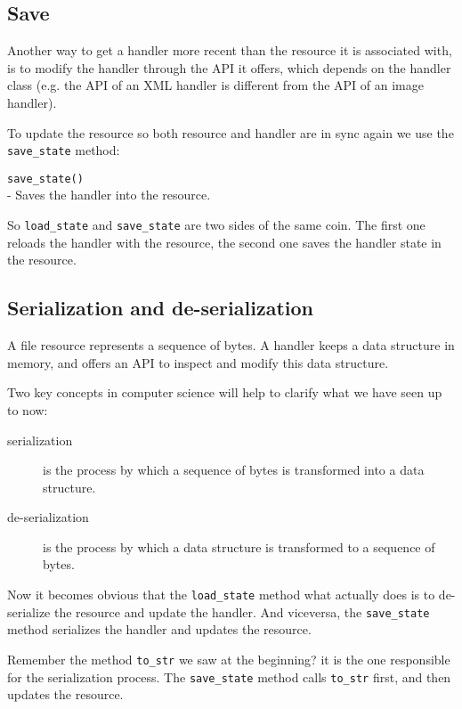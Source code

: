 \subsection{Save}

Another way to get a handler more recent than the resource it is associated
with, is to modify the handler through the API it offers, which depends
on the handler class (e.g. the API of an XML handler is different from the
API of an image handler).

To update the resource so both resource and handler are in sync again we
use the {\tt save\_state} method:

\begin{api}
  {\tt save\_state()}\\
  - Saves the handler into the resource.
\end{api}

So {\tt load\_state} and {\tt save\_state} are two sides of the same coin.
The first one reloads the handler with the resource, the second one saves
the handler state in the resource.


\subsection{Serialization and de-serialization}

A file resource represents a sequence of bytes. A handler keeps a data
structure in memory, and offers an API to inspect and modify this data
structure.

Two key concepts in computer science will help to clarify what we have
seen up to now:

\begin{description}
  \item [serialization] is the process by which a sequence of bytes is
    transformed into a data structure.

  \item [de-serialization] is the process by which a data structure is
    transformed to a sequence of bytes.
\end{description}

Now it becomes obvious that the {\tt load\_state} method what actually
does is to de-serialize the resource and update the handler. And viceversa,
the {\tt save\_state} method serializes the handler and updates the resource.

Remember the method {\tt to\_str} we saw at the beginning? it is the one
responsible for the serialization process. The {\tt save\_state} method
calls {\tt to\_str} first, and then updates the resource.


